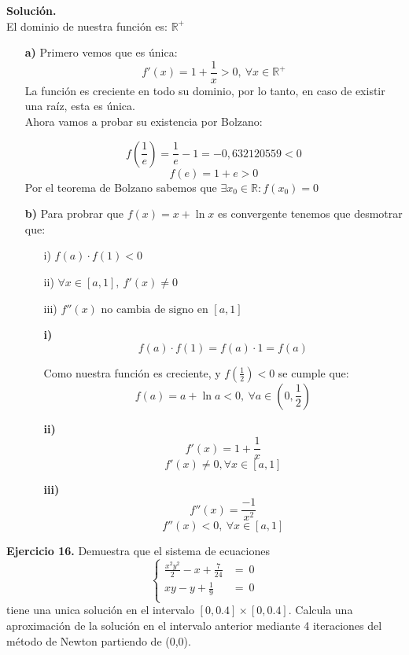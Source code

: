 \documentclass[11pt]{article}
\begin{document}
\textbf{Soluci\'on.} \\
El dominio de nuestra funci\'on es: $\mathbb{R}^+$
\begin{itemize}
\item[\textbf{a)}]
Primero vemos que es \'unica:
$$f'(x) = 1 + \frac{1}{x} > 0 ,\ \forall x \in \mathbb{R}^+ $$
La funci\'on es creciente en todo su dominio, por lo tanto, en caso de existir una ra\'iz, esta es \'unica. \\ 
Ahora vamos a probar su existencia por Bolzano:

$$f(\frac{1}{e}) = \frac{1}{e} - 1 = -0,632120559< 0$$
$$f(e) = 1 + e > 0$$
Por el teorema de Bolzano sabemos que $\exists x_0 \in \mathbb{R} : f(x_0) = 0$

\item[\textbf{b)}]
Para probrar que $f(x) = x + \ln x$ es convergente tenemos que desmotrar que:
\begin{itemize}
\item[i)]$f(a) \cdot f(1) < 0$
\item[ii)]$\forall x \in [a,1], \ f'(x) \neq 0 $
\item[iii)]$f''(x) \text{ no cambia de signo en } [a,1] $
\end{itemize}

\begin{itemize}
\item[\textbf{i)}]
$$f(a) \cdot f(1) = f(a) \cdot 1 = f(a) $$

Como nuestra funci\'on es creciente, y $f(\frac{1}{2}) < 0$ se cumple que:
$$f(a) = a + \ln a < 0 , \  \forall a \in (0, \frac{1}{2}) $$
\item[\textbf{ii)}]
$$f'(x) = 1 + \frac{1}{x} $$
$$f'(x) \neq 0 , \forall x \in [a,1] $$
\item[\textbf{iii)}]
$$f''(x) = \frac{-1}{x^2} $$
$$f''(x) < 0 , \ \forall x \in [a,1] $$
\end{itemize}
\end{itemize}

\textbf{Ejercicio 16.}
Demuestra que el sistema de ecuaciones
$$\begin{cases}
\frac{x^2y^2}{2} - x + \frac{7}{24} &= \ 0 \\
xy - y + \frac{1}{9} &= \ 0\\
\end{cases}$$
tiene una unica soluci\'on en el intervalo $[0, 0.4]\times[0, 0.4]$. Calcula una aproximaci\'on de la soluci\'on en el intervalo anterior mediante 4 iteraciones del m\'etodo de Newton partiendo de (0,0).
\\
\end{document}
